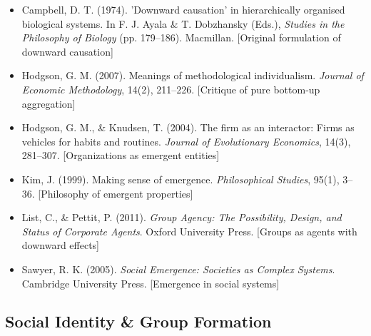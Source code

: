 \begin{itemize}

\item Campbell, D. T. (1974). 
'Downward causation' in hierarchically organised biological systems. 
In F. J. Ayala \& T. Dobzhansky (Eds.), \textit{Studies in the Philosophy of Biology} (pp. 179--186). 
Macmillan.
[Original formulation of downward causation]

\item Hodgson, G. M. (2007). 
Meanings of methodological individualism. 
\textit{Journal of Economic Methodology}, 14(2), 211--226.
[Critique of pure bottom-up aggregation]

\item Hodgson, G. M., \& Knudsen, T. (2004). 
The firm as an interactor: Firms as vehicles for habits and routines. 
\textit{Journal of Evolutionary Economics}, 14(3), 281--307.
[Organizations as emergent entities]

\item Kim, J. (1999). 
Making sense of emergence. 
\textit{Philosophical Studies}, 95(1), 3--36.
[Philosophy of emergent properties]

\item List, C., \& Pettit, P. (2011). 
\textit{Group Agency: The Possibility, Design, and Status of Corporate Agents}. 
Oxford University Press.
[Groups as agents with downward effects]

\item Sawyer, R. K. (2005). 
\textit{Social Emergence: Societies as Complex Systems}. 
Cambridge University Press.
[Emergence in social systems]

\end{itemize}

\subsection*{Social Identity \& Group Formation}


